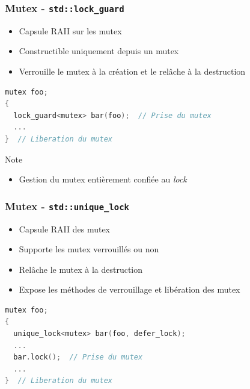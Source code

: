 \documentclass[C++.tex]{subfiles}
\begin{document}
\begin{frame}[fragile]
	\frametitle{Mutex - \lstinline|std::lock_guard|}
	\begin{itemize}
		\item Capsule RAII sur les mutex
		\item Constructible uniquement depuis un mutex
		\item Verrouille le mutex à la création et le relâche à la destruction
	\end{itemize}

	\begin{lstlisting}[language=C++]
mutex foo;
{
  lock_guard<mutex> bar(foo);  // Prise du mutex
  ...
}  // Liberation du mutex\end{lstlisting}

	\pause

	\begin{block}{Note}
		\begin{itemize}
			\item Gestion du mutex entièrement confiée au \textit{lock}
		\end{itemize}
	\end{block}
\end{frame}

\begin{frame}[fragile]
	\frametitle{Mutex - \lstinline|std::unique_lock|}
	\begin{itemize}
		\item Capsule RAII des mutex
		\item Supporte les mutex verrouillés ou non
		\item Relâche le mutex à la destruction
		\item Expose les méthodes de verrouillage et libération des mutex
	\end{itemize}

	\begin{lstlisting}[language=C++]
mutex foo;
{
  unique_lock<mutex> bar(foo, defer_lock);
  ...
  bar.lock();  // Prise du mutex
  ...
}  // Liberation du mutex\end{lstlisting}
\end{frame}
\end{document}
